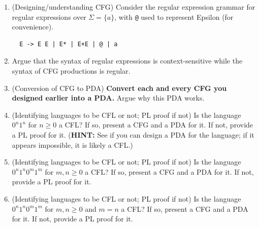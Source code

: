 \documentclass[12pt]{article}
\begin{document}
\begin{large}
\begin{enumerate}


\item (Designing/understanding CFG)
  Consider the regular expression grammar for regular expressions over $\Sigma=\{a\}$, with
  \verb|@| used to represent Epsilon (for convenience).
\begin{verbatim}
  E -> E E | E* | E+E | @ | a
\end{verbatim}

\item Argue that the syntax of regular expressions is context-sensitive
  while the syntax of CFG productions is regular.


\item (Conversion of CFG to PDA)  {\bf Convert each and every CFG you designed
  earlier into a PDA.} Argue why this PDA works.

\item (Identifying languages to be CFL or not; PL proof if not)
  Is the language $0^n 1^n$ for $n\ge 0$ a CFL? If so, present a CFG and a PDA for it.
  If not, provide a PL proof for it. ({\bf HINT:} See if you can design
  a PDA for the language; if it appears impossible, it is likely a CFL.)
  
\item (Identifying languages to be CFL or not; PL proof if not)
  Is the language $0^n 1^n 0^m 1^m$ for $m,n\ge 0$ a CFL? If so, present a CFG and a PDA for it.
  If not, provide a PL proof for it.

\item (Identifying languages to be CFL or not; PL proof if not)
  Is the language $0^n 1^n 0^m 1^m$ for $m,n\ge 0$ and $m=n$ a CFL? If so, present a CFG and a PDA for it.
  If not, provide a PL proof for it.  


\end{enumerate}
\end{large}
\end{document}
